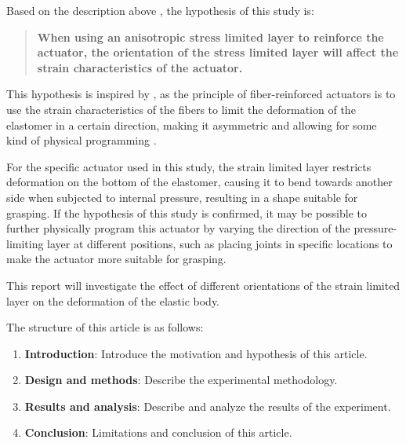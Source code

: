 \documentclass[conference]{IEEEtran}
\begin{document}
Based on the description above , the hypothesis of this study is:
\begin{quote}
\textbf{When using an anisotropic stress limited layer to reinforce the actuator, the orientation of the stress limited layer will affect the strain characteristics of the actuator.}
\end{quote}


This hypothesis is inspired by \cite{mechanical_programing}, as the principle of fiber-reinforced actuators is to use the strain characteristics of the fibers to limit the deformation of the elastomer in a certain direction, making it asymmetric and allowing for some kind of physical programming \cite{fingerlike}. 

For the specific actuator used in this study, the strain limited layer restricts deformation on the bottom of the elastomer, causing it to bend towards another side when subjected to internal pressure, resulting in a shape suitable for grasping. If the hypothesis of this study is confirmed, it may be possible to further physically program this actuator by varying the direction of the pressure-limiting layer at different positions, such as placing joints in specific locations to make the actuator more suitable for grasping.


This report will investigate the effect of different orientations of the strain limited layer on the deformation of the elastic body.


The structure of this article is as follows:
\begin{enumerate}
    \item \textbf{Introduction}: Introduce the motivation and hypothesis of this article.
    \item \textbf{Design and methods}: Describe the experimental methodology.
    \item \textbf{Results and analysis}: Describe and analyze the results of the experiment.
    \item \textbf{Conclusion}: Limitations and conclusion of this article.
\end{enumerate}
\end{document}
